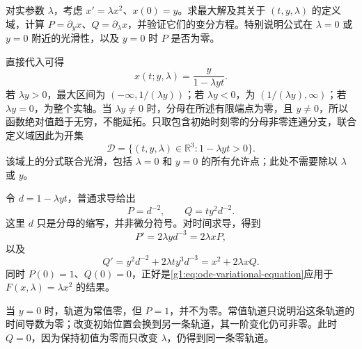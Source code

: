 \begin{exercise}\label{g1:ex:parameter-quadratic-flow}
	对实参数 \(\lambda\)，考虑 \(x'=\lambda x^2\)、\(x(0)=y\)。求最大解及其关于 \((t,y,\lambda)\) 的定义域，计算 \(P=\partial_y x\)、\(Q=\partial_\lambda x\)，并验证它们的变分方程。特别说明公式在 \(\lambda=0\) 或 \(y=0\) 附近的光滑性，以及 \(y=0\) 时 \(P\) 是否为零。
\end{exercise}
\begin{solution}
	直接代入可得
	\[
		x(t;y,\lambda)=\frac{y}{1-\lambda yt}.
	\]
	若 \(\lambda y>0\)，最大区间为 \((-\infty,1/(\lambda y))\)；若 \(\lambda y<0\)，为 \((1/(\lambda y),\infty)\)；若 \(\lambda y=0\)，为整个实轴。当 \(\lambda y\ne0\) 时，分母在所述有限端点为零，且 \(y\ne0\)，所以函数绝对值趋于无穷，不能延拓。只取包含初始时刻零的分母非零连通分支，联合定义域因此为开集
	\[
		\mathcal D=\{(t,y,\lambda)\in\mathbb R^3:1-\lambda yt>0\}.
	\]
	该域上的分式联合光滑，包括 \(\lambda=0\) 和 \(y=0\) 的所有允许点；此处不需要除以 \(\lambda\) 或 \(y\)。

	令 \(d=1-\lambda yt\)，普通求导给出
	\[
		P=d^{-2},\qquad Q=t y^2d^{-2}.
	\]
	这里 \(d\) 只是分母的缩写，并非微分符号。对时间求导，得到
	\[
		P'=2\lambda y d^{-3}=2\lambda xP,
	\]
	以及
	\[
		Q'=y^2d^{-2}+2\lambda t y^3d^{-3}
		=x^2+2\lambda xQ.
	\]
	同时 \(P(0)=1\)、\(Q(0)=0\)，正好是\eqref{g1:eq:ode-variational-equation}应用于 \(F(x,\lambda)=\lambda x^2\) 的结果。

	当 \(y=0\) 时，轨道为常值零，但 \(P=1\)，并不为零。常值轨道只说明沿这条轨道的时间导数为零；改变初始位置会换到另一条轨道，其一阶变化仍可非零。此时 \(Q=0\)，因为保持初值为零而只改变 \(\lambda\)，仍得到同一条零轨道。
\end{solution}

